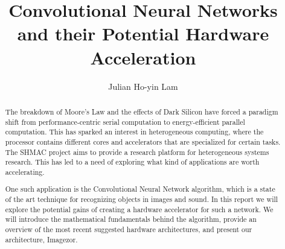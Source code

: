 \documentclass[]{report}
\title{Convolutional Neural Networks and their Potential Hardware Acceleration}
\author{Julian Ho-yin Lam}
\begin{document}

\setcounter{page}{0}

\begin{abstract}
The breakdown of Moore's Law and the effects of Dark Silicon have forced a paradigm shift from performance-centric serial computation to energy-efficient parallel computation. This has sparked an interest in heterogeneous computing, where the processor contains different cores and accelerators that are specialized for certain tasks. The SHMAC project aims to provide a research
platform for heterogeneous systems research. This has led to a need of exploring what kind of applications are worth accelerating. 

One such application is the Convolutional Neural Network algorithm, which is a state of the art technique for recognizing objects in images and sound. In this report we will explore the potential gains of creating a hardware accelerator for such a network. We will introduce the mathematical fundamentals behind the algorithm, provide an overview of the most recent suggested hardware architectures, and present our architecture, Imagezor.

\end{abstract}
\tableofcontents
\listoffigures
\listoftables
\setcounter{page}{0}










\end{document}
